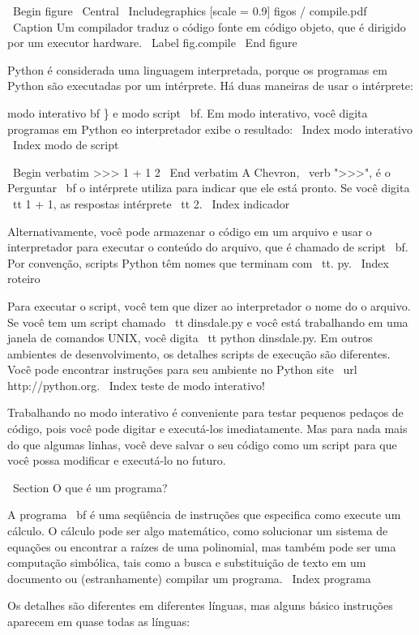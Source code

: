\documentclass[10pt]{book}
\begin{document}
\ Begin {figure}
\ Central
{\ Includegraphics [scale = 0.9] {figos / compile.pdf}}
\ Caption {Um compilador traduz o código fonte em código objeto, que é
dirigido por um executor hardware.}
\ Label {} fig.compile
\ End {figure}

Python é considerada uma linguagem interpretada, porque os programas em Python
são executadas por um intérprete. Há duas maneiras de usar o
intérprete: {modo interativo bf \} e {modo script \ bf}. Em
modo interativo, você digita programas em Python eo interpretador exibe
o resultado:
\ Index {modo interativo}
\ Index {modo de script}

\ Begin {verbatim}
>>> 1 + 1
2
\ End {verbatim}
%
A Chevron, \ verb ">>>", é o
{Perguntar \ bf} o intérprete utiliza para indicar que ele está pronto. Se
você digita {\ tt 1 + 1}, as respostas intérprete {\ tt 2}.
\ Index {indicador}

Alternativamente, você pode armazenar o código em um arquivo e usar o interpretador para
executar o conteúdo do arquivo, que é chamado de {script \ bf}. Por
convenção, scripts Python têm nomes que terminam com {\ tt. py}.
\ Index {} roteiro

Para executar o script, você tem que dizer ao interpretador o nome do
o arquivo. Se você tem um script chamado {\ tt dinsdale.py} e você está
trabalhando em uma janela de comandos UNIX, você digita {\ tt python
dinsdale.py}. Em outros ambientes de desenvolvimento, os detalhes
scripts de execução são diferentes. Você pode encontrar instruções para
seu ambiente no Python site \ url {http://python.org}.
\ Index {teste de modo interativo!}

Trabalhando no modo interativo é conveniente para testar pequenos pedaços de
código, pois você pode digitar e executá-los imediatamente. Mas para
nada mais do que algumas linhas, você deve salvar o seu código
como um script para que você possa modificar e executá-lo no futuro.


\ Section {O que é um programa?}

A {programa \ bf} é uma seqüência de instruções que especifica como
execute um cálculo. O cálculo pode ser algo
matemático, como solucionar um sistema de equações ou encontrar a
raízes de uma polinomial, mas também pode ser uma computação simbólica, tais
como a busca e substituição de texto em um documento ou (estranhamente)
compilar um programa.
\ Index {programa}

Os detalhes são diferentes em diferentes línguas, mas alguns básico
instruções aparecem em quase todas as línguas:

}
\end{document}
